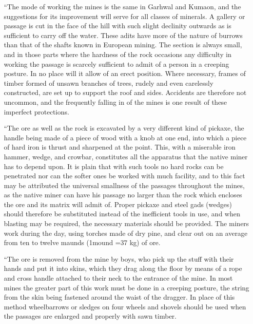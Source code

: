 ``The mode of working the mines is the same in Garhwal and Kumaon, and the suggestions for its improvement will serve for all classes of minerals. A gallery or passage is cut in the face of the hill with such slight declinity outwards as is sufficient to carry off the water. These adits have more of the nature of burrows than that of the shafts known in European mining. The section is always small, and in those parts where the hardness of the rock occasions any difficulty in working the passage is scarcely sufficient to admit of a person in a creeping posture. In no place will it allow of an erect position. Where necessary, frames of timber formed of unsawn branches of trees, rudely and even carelessly constructed, are set up to support the roof and sides. Accidents are therefore not uncommon, and the frequently falling in of the mines is one result of these imperfect protections.

``The ore as well as the rock is excavated by a very different kind of pickaxe, the handle being made of a piece of wood with a knob at one end, into which a piece of hard iron is thrust and sharpened at the point. This, with a miserable iron hammer, wedge, and crowbar, constitutes all the apparatus that the native miner has to depend upon. It is plain that with such tools no hard rocks can be penetrated nor can the softer ones be worked with much facility, and to this fact may be attributed the universal smallness of the passages throughout the mines, as the native miner can have his passage no larger than the rock which encloses the ore and its matrix will admit of. Proper pickaxe and steel gads (wedges) should therefore be substituted instead of the inefficient tools in use, and when blasting may be required, the necessary materials should be provided. The miners work during the day, using torches made of dry pine, and clear out on an average from ten to twelve maunds (1mound =37 kg) of ore.


``The ore is removed from the mine by boys, who pick up the stuff with their hands and put it into skins, which they drag along the floor by means of a rope and cross handle attached to their neck to the entrance of the mine. In most mines the greater part of this work must be done in a creeping posture, the string from the skin being fastened around the waist of the dragger. In place of this method wheelbarrows or sledges on four wheels and shovels should be used when the passages are enlarged and properly with sawn timber.

